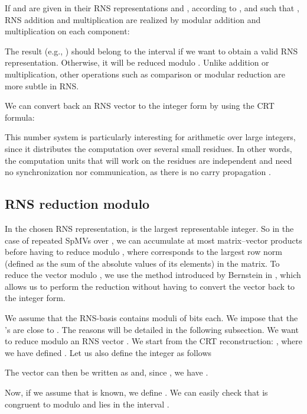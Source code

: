 \documentclass[runningheads,orivec]{llncs}
\begin{document}
If  and  are given in their RNS representations  and , according to , and such that , RNS addition and multiplication are realized by modular addition and multiplication on each component:

The result (e.g., ) should belong to the interval  if we want to obtain a valid RNS representation. Otherwise, it will be reduced modulo . Unlike addition or multiplication, other operations such as comparison or modular reduction are more subtle in RNS.
 
We can convert back an RNS vector to the integer form by using the CRT formula:



This number system is particularly interesting for arithmetic over large integers, since it distributes the computation over several small residues. In other words, the computation units that will work on the residues are independent and need no synchronization nor communication, as there is no carry propagation \cite{TANA67,TAYL84}.

\vspace*{-0.25cm}

\subsection{RNS reduction modulo }
\vspace*{-0.25cm}
\label{modular reduction}



In the chosen RNS representation,  is the largest representable integer. So in the case of repeated SpMVs over , we can accumulate at most  matrix--vector products before having to reduce modulo , where  corresponds to the largest row norm (defined as the sum of the absolute values of its elements) in the matrix. To reduce the vector  modulo , we use the method introduced by Bernstein in \cite{BERN95}, which allows us to perform the reduction without having to convert the vector back to the integer form.

We assume that the RNS-basis  contains  moduli  of  bits each. We impose that the 's are close to . The reasons will be detailed in the following subsection. We want to reduce modulo  an RNS vector . We start from the CRT reconstruction:  
 , where we have defined . Let us also define the integer  as follows 



The vector  can then be written as  and, since , we have .
 
Now, if we assume that  is known, we define . We can easily check that  is congruent to  modulo  and lies in the interval .
\end{document}
